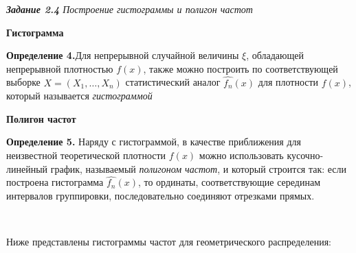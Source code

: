 \documentclass[a4paper,12pt, oneside]{book}
\begin{document}
\newpage
{\large\textit{\textbf{Задание 2.4} Построение гистограммы и полигон частот}}

\vspace{5mm}
\large{\textbf{Гистограмма}}
\vspace{5mm}

\normalsize{\textbf{Определение 4.}}Для непрерывной случайной величины $\xi$, обладающей непрерывной плотностью $f(x)$, также можно построить по соответствующей выборке $X = (X_1, \ldots, X_n)$ статистический аналог $\hat{f_n} (x)$ для плотности $f(x)$, который называется \textit{гистограммой}  

\vspace{5mm}
\large{\textbf{Полигон частот}}
\vspace{5mm}

\normalsize{\textbf{Определение 5.}} Наряду с гистограммой, в качестве приближения для неизвестной теоретической плотности $ f(x)$ можно использовать кусочно-линейный график, называемый \textit{полигоном частот}, и который строится так: если построена гистограмма $\hat{f_n} (x)$, то ординаты, соответствующие серединам интервалов группировки, последовательно соединяют отрезками прямых. 

\vspace{5mm}
\\
\vspace{5mm}


Ниже представлены гистограммы частот для геометрического распределения:\\
\end{document}
